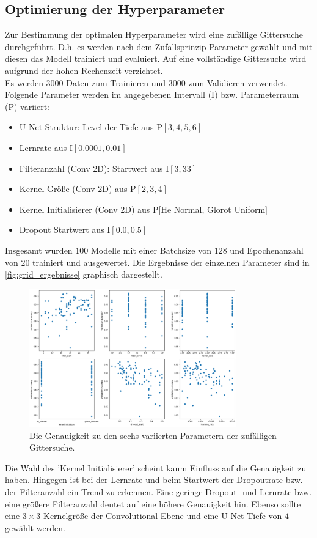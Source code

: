 \subsection{Optimierung der Hyperparameter}
\label{sec:Hyperparameter}
Zur Bestimmung der optimalen Hyperparameter wird eine zufällige Gittersuche durchgeführt.
D.h. es werden nach dem Zufallsprinzip Parameter gewählt und mit diesen das Modell trainiert und evaluiert.
Auf eine vollständige Gittersuche wird aufgrund der hohen Rechenzeit verzichtet.
\\
Es werden $3000$ Daten zum Trainieren und $3000$ zum Validieren verwendet.
\\
Folgende Parameter werden im angegebenen Intervall (I) bzw. Parameterraum (P) variiert:
\begin{itemize}
    \setlength\itemsep{0.10em}
    \item U-Net-Struktur: Level der Tiefe aus P$[3, 4, 5, 6]$
    \item Lernrate aus I$[0.0001, 0.01]$
    \item Filteranzahl (Conv 2D): Startwert aus I$[3, 33]$
    \item Kernel-Größe (Conv 2D) aus P$[2, 3, 4]$
    \item Kernel Initialisierer (Conv 2D) aus P$[$He Normal, Glorot Uniform$]$
    \item Dropout Startwert aus I$[0.0, 0.5]$
\end{itemize}
Insgesamt wurden $100$ Modelle mit einer Batchsize von $128$ und Epochenanzahl von $20$ trainiert und ausgewertet.
Die Ergebnisse der einzelnen Parameter sind in \autoref{fig:grid_ergebnisse} graphisch dargestellt.
\begin{figure}
    \centering
    \includegraphics[width=0.8\textwidth]{content/img/grid_ergebnisse.png}
    \caption{Die Genauigkeit zu den sechs variierten Parametern der zufälligen Gittersuche.}
    \label{fig:grid_ergebnisse}
\end{figure}
\FloatBarrier
Die Wahl des 'Kernel Initialisierer' scheint kaum Einfluss auf die Genauigkeit zu haben.
Hingegen ist bei der Lernrate und beim Startwert der Dropoutrate bzw. der Filteranzahl ein Trend zu erkennen.
Eine geringe Dropout- und Lernrate bzw. eine größere Filteranzahl deutet auf eine höhere Genauigkeit hin.
Ebenso sollte eine $3\times3$ Kernelgröße der Convolutional Ebene und eine U-Net Tiefe von $4$ gewählt werden.

